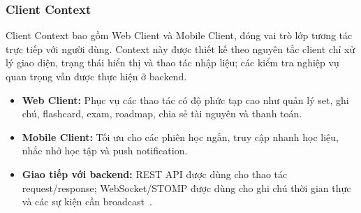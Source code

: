 \subsubsection{Client Context}
\label{subsubsec:client-context}

Client Context bao gồm Web Client và Mobile Client, đóng vai trò lớp tương tác trực tiếp với người dùng. Context này được thiết kế theo nguyên tắc client chỉ xử lý giao diện, trạng thái hiển thị và thao tác nhập liệu; các kiểm tra nghiệp vụ quan trọng vẫn được thực hiện ở backend.

\begin{itemize}
    \item \textbf{Web Client:} Phục vụ các thao tác có độ phức tạp cao như quản lý set, ghi chú, flashcard, exam, roadmap, chia sẻ tài nguyên và thanh toán.
    \item \textbf{Mobile Client:} Tối ưu cho các phiên học ngắn, truy cập nhanh học liệu, nhắc nhở học tập và push notification.
    \item \textbf{Giao tiếp với backend:} REST API được dùng cho thao tác request/response; WebSocket/STOMP được dùng cho ghi chú thời gian thực và các sự kiện cần broadcast~\cite{springwebsocketstomp}.
\end{itemize}